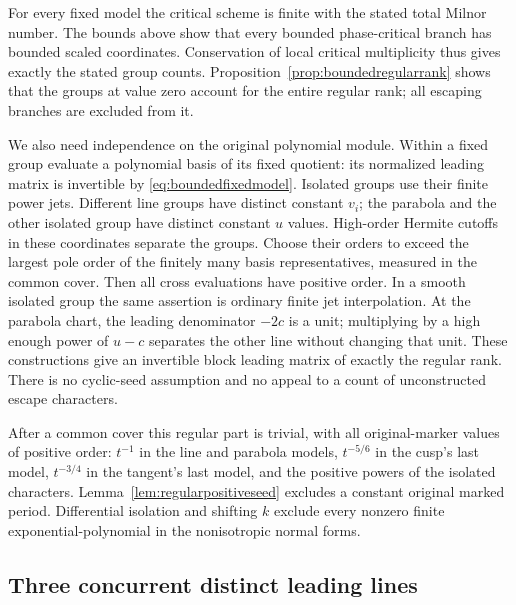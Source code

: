 \documentclass[11pt]{article}
\theoremstyle{definition}\newtheorem{definition}[theorem]{Definition}
\theoremstyle{remark}\newtheorem{remark}[theorem]{Remark}
\begin{document}
For every fixed model the critical scheme is finite with the
stated total Milnor number. The bounds above show that every
bounded phase-critical branch has bounded scaled coordinates.
Conservation of local critical multiplicity thus gives exactly
the stated group counts. Proposition~\ref{prop:boundedregularrank}
shows that the groups at value zero account for the entire
regular rank; all escaping branches are excluded from it.

We also need independence on the original polynomial module.
Within a fixed group evaluate a polynomial basis of its fixed
quotient: its normalized leading matrix is invertible by
\eqref{eq:boundedfixedmodel}. Isolated groups use their finite
power jets. Different line groups have distinct constant $v_i$;
the parabola and the other isolated group have distinct constant
$u$ values. High-order Hermite cutoffs in these coordinates
separate the groups. Choose their orders to exceed the largest pole order of the
finitely many basis representatives, measured in the common cover.
Then all cross evaluations have positive order. In a smooth
isolated group the same assertion is ordinary finite jet
interpolation. At the parabola chart, the leading denominator
$-2c$ is a unit; multiplying by a high enough power of
$u-c$ separates the other line without changing that unit.
These constructions give an invertible block leading matrix
of exactly the regular rank. There is no cyclic-seed assumption
and no appeal to a count of unconstructed escape characters.

After a common cover this regular part is trivial, with all
original-marker values of positive order: $t^{-1}$ in the
line and parabola models, $t^{-5/6}$ in the cusp's last model,
$t^{-3/4}$ in the tangent's last model, and the positive powers
of the isolated characters. Lemma~\ref{lem:regularpositiveseed}
excludes a constant original marked period. Differential
isolation and shifting $k$ exclude every nonzero finite
exponential-polynomial in the nonisotropic normal forms.


\subsection{Three concurrent distinct leading lines}
\label{sec:concurrentregular}
\end{document}
